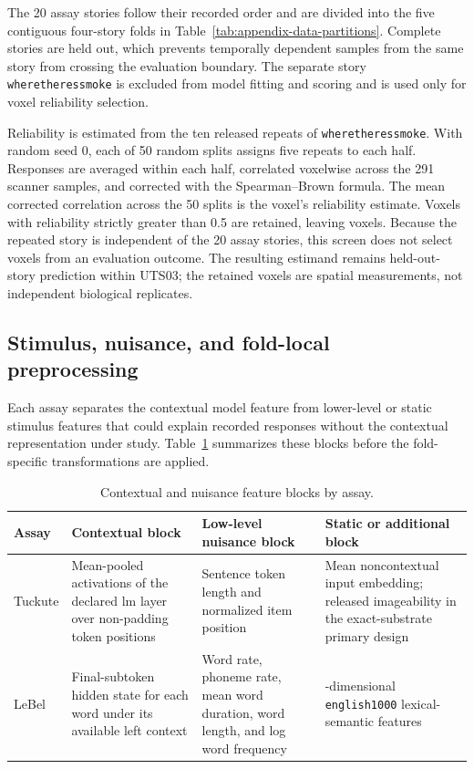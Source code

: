The 20 assay stories follow their recorded order and are divided into the five contiguous four-story folds in Table~\ref{tab:appendix-data-partitions}.
Complete stories are held out, which prevents temporally dependent samples from the same story from crossing the evaluation boundary.
The separate story \texttt{wheretheressmoke} is excluded from model fitting and scoring and is used only for voxel reliability selection. 

Reliability is estimated from the ten released repeats of \texttt{wheretheressmoke}.
With random seed 0, each of 50 random splits assigns five repeats to each half.
Responses are averaged within each half, correlated voxelwise across the 291 scanner samples, and corrected with the Spearman--Brown formula.
The mean corrected correlation across the 50 splits is the voxel's reliability estimate.
Voxels with reliability strictly greater than 0.5 are retained, leaving  voxels.
Because the repeated story is independent of the 20 assay stories, this screen does not select voxels from an evaluation outcome.
The resulting estimand remains held-out-story prediction within UTS03; the retained voxels are spatial measurements, not independent biological replicates. 

\subsection{Stimulus, nuisance, and fold-local preprocessing}

Each assay separates the contextual model feature from lower-level or static stimulus features that could explain recorded responses without the contextual representation under study.
Table~\ref{tab:appendix-feature-blocks} summarizes these blocks before the fold-specific transformations are applied.

\begin{table}[H]
  \centering
  \small
  \caption{Contextual and nuisance feature blocks by assay.}
  \label{tab:appendix-feature-blocks}
  \begin{tabularx}{\textwidth}{@{}>{\raggedright\arraybackslash}p{}>{\raggedright\arraybackslash}X>{\raggedright\arraybackslash}X>{\raggedright\arraybackslash}X@{}}
    \toprule
    Assay & Contextual block & Low-level nuisance block & Static or additional block \\
    \midrule
    Tuckute & Mean-pooled activations of the declared \ac{lm} layer over non-padding token positions & Sentence token length and normalized item position & Mean noncontextual input embedding; released imageability in the exact-substrate primary design \\
    \midrule
    LeBel & Final-subtoken hidden state for each word under its available left context & Word rate, phoneme rate, mean word duration, word length, and log word frequency & 985-dimensional \texttt{english1000} lexical-semantic features \\
    \bottomrule
  \end{tabularx}
\end{table}

